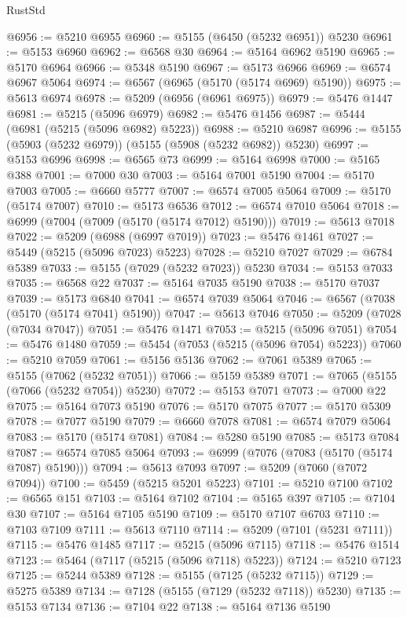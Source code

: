 \begin{lexlean}{RustStd}
\begin{coremodule}
@6956 := @5210 @6955
@6960 := @5155 (@6450 (@5232 @6951)) @5230
@6961 := @5153 @6960
@6962 := @6568 @30
@6964 := @5164 @6962 @5190
@6965 := @5170 @6964
@6966 := @5348 @5190
@6967 := @5173 @6966
@6969 := @6574 @6967 @5064
@6974 := @6567 (@6965 (@5170 (@5174 @6969) @5190))
@6975 := @5613 @6974
@6978 := @5209 (@6956 (@6961 @6975))
@6979 := @5476 @1447
@6981 := @5215 (@5096 @6979)
@6982 := @5476 @1456
@6987 := @5444 (@6981 (@5215 (@5096 @6982) @5223))
@6988 := @5210 @6987
@6996 := @5155 (@5903 (@5232 @6979)) (@5155 (@5908 (@5232 @6982)) @5230)
@6997 := @5153 @6996
@6998 := @6565 @73
@6999 := @5164 @6998
@7000 := @5165 @388
@7001 := @7000 @30
@7003 := @5164 @7001 @5190
@7004 := @5170 @7003
@7005 := @6660 @5777
@7007 := @6574 @7005 @5064
@7009 := @5170 (@5174 @7007)
@7010 := @5173 @6536
@7012 := @6574 @7010 @5064
@7018 := @6999 (@7004 (@7009 (@5170 (@5174 @7012) @5190)))
@7019 := @5613 @7018
@7022 := @5209 (@6988 (@6997 @7019))
@7023 := @5476 @1461
@7027 := @5449 (@5215 (@5096 @7023) @5223)
@7028 := @5210 @7027
@7029 := @6784 @5389
@7033 := @5155 (@7029 (@5232 @7023)) @5230
@7034 := @5153 @7033
@7035 := @6568 @22
@7037 := @5164 @7035 @5190
@7038 := @5170 @7037
@7039 := @5173 @6840
@7041 := @6574 @7039 @5064
@7046 := @6567 (@7038 (@5170 (@5174 @7041) @5190))
@7047 := @5613 @7046
@7050 := @5209 (@7028 (@7034 @7047))
@7051 := @5476 @1471
@7053 := @5215 (@5096 @7051)
@7054 := @5476 @1480
@7059 := @5454 (@7053 (@5215 (@5096 @7054) @5223))
@7060 := @5210 @7059
@7061 := @5156 @5136
@7062 := @7061 @5389
@7065 := @5155 (@7062 (@5232 @7051))
@7066 := @5159 @5389
@7071 := @7065 (@5155 (@7066 (@5232 @7054)) @5230)
@7072 := @5153 @7071
@7073 := @7000 @22
@7075 := @5164 @7073 @5190
@7076 := @5170 @7075
@7077 := @5170 @5309
@7078 := @7077 @5190
@7079 := @6660 @7078
@7081 := @6574 @7079 @5064
@7083 := @5170 (@5174 @7081)
@7084 := @5280 @5190
@7085 := @5173 @7084
@7087 := @6574 @7085 @5064
@7093 := @6999 (@7076 (@7083 (@5170 (@5174 @7087) @5190)))
@7094 := @5613 @7093
@7097 := @5209 (@7060 (@7072 @7094))
@7100 := @5459 (@5215 @5201 @5223)
@7101 := @5210 @7100
@7102 := @6565 @151
@7103 := @5164 @7102
@7104 := @5165 @397
@7105 := @7104 @30
@7107 := @5164 @7105 @5190
@7109 := @5170 @7107 @6703
@7110 := @7103 @7109
@7111 := @5613 @7110
@7114 := @5209 (@7101 (@5231 @7111))
@7115 := @5476 @1485
@7117 := @5215 (@5096 @7115)
@7118 := @5476 @1514
@7123 := @5464 (@7117 (@5215 (@5096 @7118) @5223))
@7124 := @5210 @7123
@7125 := @5244 @5389
@7128 := @5155 (@7125 (@5232 @7115))
@7129 := @5275 @5389
@7134 := @7128 (@5155 (@7129 (@5232 @7118)) @5230)
@7135 := @5153 @7134
@7136 := @7104 @22
@7138 := @5164 @7136 @5190

\end{coremodule}
\end{lexlean}
